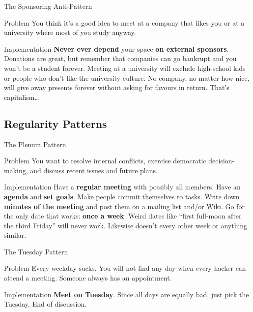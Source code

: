 \documentclass[mathserif]{beamer}
\begin{document}
\begin{frame}{The Sponsoring Anti-Pattern}
	\begin{alertblock}{Problem}
		You think it's a good idea to meet at a company that likes you or at a
		university where most of you study anyway.
	\end{alertblock}
	\pause
	\begin{exampleblock}{Implementation}
		\textbf{Never ever depend} your space \textbf{on external sponsors}.
		Donations are great, but remember that companies can go bankrupt and you
		won't be a student forever.  Meeting at a university will exclude
		high-school kids or people who don't like the university culture.  No
		company, no matter how nice, will give away presents forever without asking
		for favours in return.  That's capitalism…
	\end{exampleblock}
\end{frame}


\subsection{Regularity Patterns}

\begin{frame}{The Plenum Pattern}
	\begin{alertblock}{Problem}
		You want to resolve internal conflicts, exercise democratic
		decision-making, and discuss recent issues and future plans.
	\end{alertblock}
	\pause
	\begin{exampleblock}{Implementation}
		Have a \textbf{regular meeting} with possibly all members.  Have an
		\textbf{agenda} and \textbf{set goals}.  Make people commit themselves to
		tasks.  Write down \textbf{minutes of the meeting} and post them on a mailing
		list and/or Wiki.  Go for the only date that works: \textbf{once a week}.
		Weird dates like “first full-moon after the third Friday” will never work.
		Likewise doesn't every other week or anything similar.
	\end{exampleblock}
\end{frame}

\begin{frame}{The Tuesday Pattern}
	\begin{alertblock}{Problem}
		Every weekday sucks.  You will not find any day when every hacker can attend
		a meeting.  Someone always has an appointment.
	\end{alertblock}
	\pause
	\begin{exampleblock}{Implementation}
		\textbf{Meet on Tuesday}.  Since all days are equally bad, just pick the
		Tuesday.  End of discussion.
	\end{exampleblock}
\end{frame}
\end{document}
